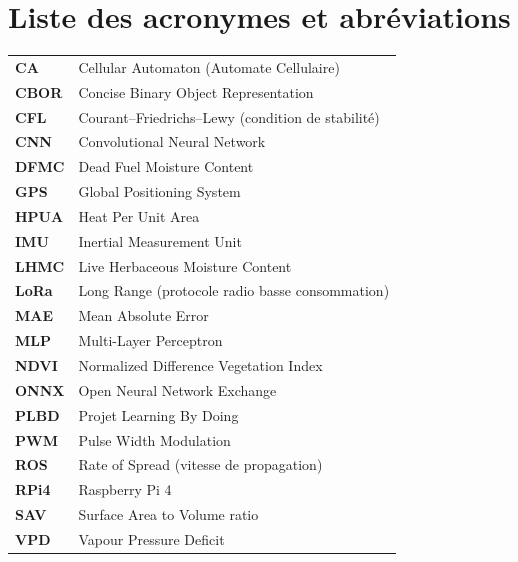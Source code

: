 \documentclass[a4paper,12pt,openany,titlepage]{scrartcl}
\begin{document}
\tableofcontents
\listoffigures
\listoftables

\section*{Liste des acronymes et abréviations}

\begin{tabularx}{\textwidth}{lX}
\textbf{CA} & Cellular Automaton (Automate Cellulaire) \\
\textbf{CBOR} & Concise Binary Object Representation \\
\textbf{CFL} & Courant--Friedrichs--Lewy (condition de stabilité) \\
\textbf{CNN} & Convolutional Neural Network \\
\textbf{DFMC} & Dead Fuel Moisture Content \\
\textbf{GPS} & Global Positioning System \\
\textbf{HPUA} & Heat Per Unit Area \\
\textbf{IMU} & Inertial Measurement Unit \\
\textbf{LHMC} & Live Herbaceous Moisture Content \\
\textbf{LoRa} & Long Range (protocole radio basse consommation) \\
\textbf{MAE} & Mean Absolute Error \\
\textbf{MLP} & Multi-Layer Perceptron \\
\textbf{NDVI} & Normalized Difference Vegetation Index \\
\textbf{ONNX} & Open Neural Network Exchange \\
\textbf{PLBD} & Projet Learning By Doing \\
\textbf{PWM} & Pulse Width Modulation \\
\textbf{ROS} & Rate of Spread (vitesse de propagation) \\
\textbf{RPi4} & Raspberry Pi 4 \\
\textbf{SAV} & Surface Area to Volume ratio \\
\textbf{VPD} & Vapour Pressure Deficit \\
\end{tabularx}

\newpage
{}
\setcounter{page}{1}
\pagestyle{plain}

\end{document}
